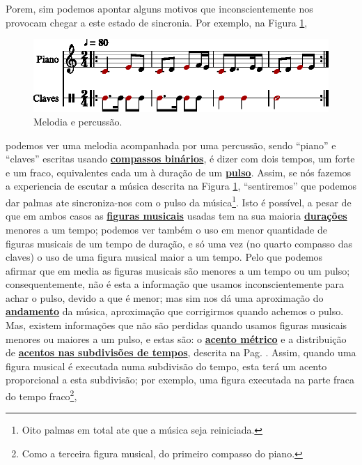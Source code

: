 Porem, sim podemos apontar alguns motivos que inconscientemente nos provocam chegar a este estado de sincronia.
Por exemplo, na Figura \ref{ritmo:procurando-pulso1},
\begin{figure}[!h]
\centering
    \includegraphics[width=\textwidth]{chapters/cap-musicalidade-percepcion/procurando-pulso1-1.eps}
\caption{Melodia e percussão.}
\label{ritmo:procurando-pulso1}
\end{figure}
podemos ver uma melodia acompanhada por uma percussão,
sendo ``piano'' e ``claves'' escritas usando  \hyperref[subsec:compassobinario]{\textbf{compassos binários}}, 
é dizer com dois tempos, um forte e um fraco, equivalentes cada um à duração de um \hyperref[ref:Pulso]{\textbf{pulso}}.
Assim, se nós fazemos a experiencia de escutar a música descrita na Figura \ref{ritmo:procurando-pulso1},
``sentiremos'' que podemos dar palmas ate sincroniza-nos com o pulso da música\footnote{Oito
palmas em total ate que a música seja reiniciada.}.
Isto é possível, 
a pesar de que em ambos casos as \hyperref[sec:figurasmusicais]{\textbf{figuras musicais}} usadas tem na sua maioria
\hyperref[sec:pos:Duracion]{\textbf{durações}} menores a um tempo;
podemos ver também o uso em menor quantidade de figuras musicais de um tempo de duração,
e só uma vez (no quarto compasso das claves) o uso de uma figura musical maior a um tempo. 
Pelo que podemos afirmar que em media as figuras musicais são menores a um tempo ou um pulso; consequentemente, 
não é esta a informação que usamos inconscientemente para achar o pulso,
devido a que é menor;
mas sim nos dá uma  aproximação do \hyperref[sec:Andamento]{\textbf{andamento}} da música,
aproximação que corrigirmos quando achemos o pulso.
Mas, existem informações que não são perdidas quando usamos figuras musicais menores ou maiores a um pulso,
e estas  são: o \hyperref[def:acentometrico]{\textbf{acento métrico}} e a 
distribuição de \hyperref[eq:acentosubdividio]{\textbf{acentos nas subdivisões de tempos}},
descrita na Pag. \pageref{eq:acentosubdividio}.
Assim, quando uma figura musical  é executada numa subdivisão do tempo, 
esta terá um acento proporcional a esta subdivisão;
por exemplo, uma figura executada na parte fraca do tempo fraco\footnote{Como
a terceira figura musical, do primeiro compasso do piano.}, 
